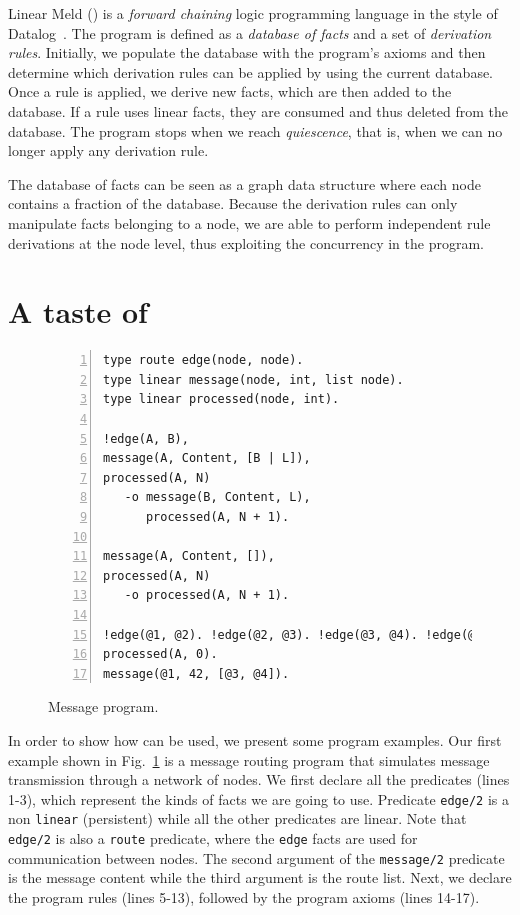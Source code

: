 
Linear Meld (\lang) is a \emph{forward chaining} logic programming language in the style of Datalog~\cite{Ullman:1990:PDK:533142}. The program is defined as a \emph{database of facts} and a set of \emph{derivation rules}.
Initially, we populate the database with the program's axioms and then determine which derivation rules can be applied by using the current database. Once a rule is applied, we derive new facts, which are then added to the database.
If a rule uses linear facts, they are consumed and thus deleted from the database.
The program stops when we reach \emph{quiescence}, that is, when we can no longer
apply any derivation rule.

The database of facts can be seen as a graph data structure where each node contains a
fraction of the database.
Because the derivation rules can only manipulate facts belonging to
a node, we are able to perform independent rule derivations at the node level, thus
exploiting the concurrency in the program.

\section{A taste of \lang}

\begin{figure}[h!]
\small\begin{Verbatim}[numbers=left]
type route edge(node, node).
type linear message(node, int, list node).
type linear processed(node, int).

!edge(A, B),
message(A, Content, [B | L]),
processed(A, N)
   -o message(B, Content, L),
      processed(A, N + 1).

message(A, Content, []),
processed(A, N)
   -o processed(A, N + 1).

!edge(@1, @2). !edge(@2, @3). !edge(@3, @4). !edge(@1, @3).
processed(A, 0).
message(@1, 42, [@3, @4]).
\end{Verbatim}
\caption{Message program.}
  \label{code:message}
\end{figure}

In order to show how \lang can be used, we present some \lang program examples.
Our first example shown in Fig.~\ref{code:message} is a message routing program
that simulates message transmission through a network of nodes.
We first declare all the predicates (lines 1-3), which represent the kinds of facts we are going to
use. Predicate \texttt{edge/2} is a non \texttt{linear} (persistent) while all the other predicates are linear.
Note that \texttt{edge/2} is also a \texttt{route} predicate, where the \texttt{edge} facts are used
for communication between nodes. The second argument of the \texttt{message/2} predicate is the message content
while the third argument is the route list.
Next, we declare the program rules (lines 5-13),
followed by the program axioms (lines 14-17).

